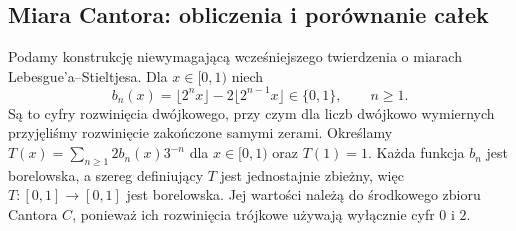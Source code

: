 \subsection*{Miara Cantora: obliczenia i porównanie całek}
\begin{przyklad}
\label{ex:cantor-measure-17}
Podamy konstrukcję niewymagającą wcześniejszego twierdzenia
o miarach Lebesgue'a--Stieltjesa. Dla $x\in[0,1)$ niech
\[
b_n(x)=\lfloor2^nx\rfloor-2\lfloor2^{n-1}x\rfloor\in\{0,1\},
\qquad n\ge1.
\]
Są to cyfry rozwinięcia dwójkowego, przy czym dla liczb
dwójkowo wymiernych przyjęliśmy rozwinięcie zakończone
samymi zerami. Określamy
$T(x)=\sum_{n\ge1}2b_n(x)3^{-n}$ dla $x\in[0,1)$
oraz $T(1)=1$. Każda funkcja $b_n$ jest borelowska,
a szereg definiujący $T$ jest jednostajnie zbieżny,
więc $T:[0,1]\to[0,1]$ jest borelowska. Jej wartości
należą do środkowego zbioru Cantora $C$, ponieważ ich
rozwinięcia trójkowe używają wyłącznie cyfr $0$ i $2$.


\end{przyklad}
